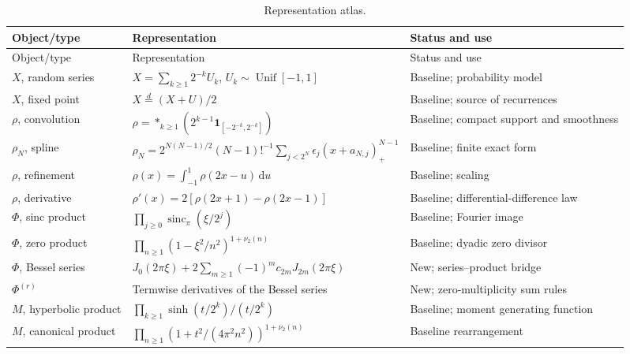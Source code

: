 \documentclass[11pt,oneside]{article}
\theoremstyle{definition}
\newcommand{\sincpi}{\operatorname{sinc}_{\!\pi}}
\newcommand{\dd}{\,\mathrm d}
\newcommand{\vTwo}{\nu_2}
\begin{document}
\small
\begin{longtable}{p{}p{}p{}}
\caption{Representation atlas.}\label{tab:atlas}\\
\toprule
Object/type & Representation & Status and use\\
\midrule
\endfirsthead
\toprule
Object/type & Representation & Status and use\\
\midrule
\endhead
\bottomrule
\endfoot

\(X\), random series &
\(X=\sum_{k\ge1}2^{-k}U_k\), \(U_k\sim\operatorname{Unif}[-1,1]\) &
Baseline; probability model\\

\(X\), fixed point &
\(X\stackrel d=(X+U)/2\) &
Baseline; source of recurrences\\

\(\rho\), convolution &
\(\rho=*_{k\ge1}(2^{k-1}\mathbf1_{[-2^{-k},2^{-k}]})\) &
Baseline; compact support and smoothness\\

\(\rho_N\), spline &
\(\rho_N=2^{N(N-1)/2}(N-1)!^{-1}\sum_{j<2^N}\epsilon_j(x+a_{N,j})_+^{N-1}\) &
Baseline; finite exact form\\

\(\rho\), refinement &
\(\rho(x)=\int_{-1}^{1}\rho(2x-u)\dd u\) &
Baseline; scaling\\

\(\rho\), derivative &
\(\rho'(x)=2[\rho(2x+1)-\rho(2x-1)]\) &
Baseline; differential-difference law\\

\(\Phi\), sinc product &
\(\prod_{j\ge0}\sincpi(\xi/2^j)\) &
Baseline; Fourier image\\

\(\Phi\), zero product &
\(\prod_{n\ge1}(1-\xi^2/n^2)^{1+\vTwo(n)}\) &
Baseline; dyadic zero divisor\\

\(\Phi\), Bessel series &
\(J_0(2\pi\xi)+2\sum_{m\ge1}(-1)^mc_{2m}J_{2m}(2\pi\xi)\) &
New; series--product bridge\\

\(\Phi^{(r)}\) &
Termwise derivatives of the Bessel series &
New; zero-multiplicity sum rules\\

\(M\), hyperbolic product &
\(\prod_{k\ge1}\sinh(t/2^k)/(t/2^k)\) &
Baseline; moment generating function\\

\(M\), canonical product &
\(\prod_{n\ge1}(1+t^2/(4\pi^2n^2))^{1+\vTwo(n)}\) &
Baseline rearrangement\\


\end{longtable}
\end{document}
